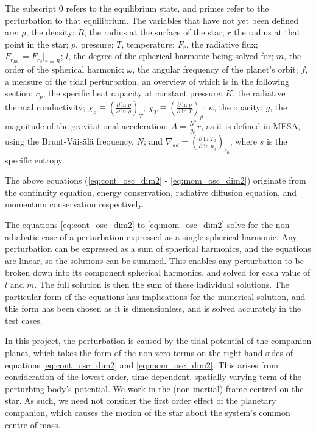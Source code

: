 \documentclass[11pt]{amsart}
\begin{document}
The subscript $0$ refers to the equilibrium state, and primes refer to the perturbation to that equilibrium.  The variables that have not yet been defined are: $\rho$, the density; $R$, the radius at the surface of the star; $r$ the radius at that point in the star; $p$, pressure; $T$, temperature; $F_{r}$, the radiative flux; $F_{r_{BC}} = F_{r_{0}} |_{r=R}$; $l$, the degree of the spherical harmonic being solved for; $m$, the order of the spherical harmonic; $\omega$, the angular frequency of the planet's orbit; $f$, a measure of the tidal perturbation, an overview of which is in the following section;  $c_{p}$, the specific heat capacity at constant pressure; $K$, the radiative thermal conductivity; $\chi_{\rho} \equiv \left( \frac{\partial \ln p}{\partial \ln \rho} \right)_{T}$; $\chi_{T} \equiv \left( \frac{\partial \ln p}{\partial \ln T} \right)_{\rho}$; $\kappa$, the opacity; $g$, the magnitude of the gravitational acceleration; $A = \frac{N^{2}}{g_{0}} r$, as it is defined in MESA, using the Brunt-V\"{a}is\"{a}l\"{a} frequency, $N$; and $\nabla_{ad} = \left( \frac{\partial \ln T_{0}}{\partial \ln p_{0}} \right)_{s_{0}}$, where $s$ is the specific entropy.

The above equations (\ref{eq:cont_osc_dim2} - \ref{eq:mom_osc_dim2}) originate from the continuity equation, energy conservation, radiative diffusion equation, and momentum conservation respectively. 


The equations \ref{eq:cont_osc_dim2} to \ref{eq:mom_osc_dim2} solve for the non-adiabatic case of a perturbation expressed as a single spherical harmonic.  Any perturbation can be expressed as a sum of spherical harmonics, and the equations are linear, so the solutions can be summed.  This enables any perturbation to be broken down into its component spherical harmonics, and solved for each value of $l$ and $m$.  The full solution is then the sum of these individual solutions.  The particular form of the equations has implications for the numerical solution, and this form has been chosen as it is dimensionless, and is solved accurately in the test cases.

In this project, the perturbation is caused by the tidal potential of the companion planet, which takes the form of the non-zero terms on the right hand sides of equations \ref{eq:cont_osc_dim2} and \ref{eq:mom_osc_dim2}.  This arises from consideration of the lowest order, time-dependent, spatially varying term of the perturbing body's potential.  We work in the (non-inertial) frame centred on the star.  As such, we need not consider the first order effect of the planetary companion, which causes the motion of the star about the system's common centre of mass.
\end{document}
